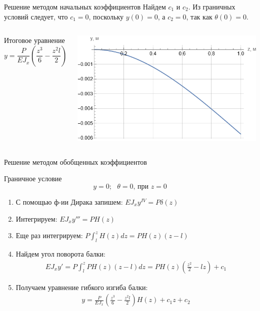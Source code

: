 \documentclass[ignoreonframetext,unicode]{beamer}
\begin{document}
	\begin{frame}{Решение методом начальных коэффициентов}
Найдем $c_1$ и $c_2$. Из граничных условий следует, что $c_1 = 0$, поскольку $y(0) = 0$, а $c_2 = 0$, так как $\theta(0) = 0$.
\begin{columns}
\begin{block}{Итоговое уравнение}	
	\[
	y = \frac{P}{E J_{x}} (\frac{z^3}{6} - \frac{z^2 l}{2})
	\]
\end{block}
\includegraphics[width=\textwidth]{g.1}
\end{columns}
\end{frame}

	\begin{frame}{Решение методом обобщенных коэффициентов}
	
	\begin{block}{Граничное условие}
		\[
		y = 0;\mbox{ } \theta = 0\mbox{, при } z = 0
		\]		
	\end{block}
	
	\begin{enumerate}
		\item С помощью ф-ии Дирака запишем: $E J_{x} y^{IV} = P \delta (z)$
		
		\item Интегрируем:
		$
			E J_{x} y''' = P H (z)
		$
		
		\item Еще раз интегрируем:
		$
			P \int_l^z  H (z) dz = P H (z) (z - l)
		$
		
		\item Найдем угол поворота балки:
		\begin{gather*}
			E J_{x} y' = P \int_l^z P H (z) (z - l) dz = P H(z)(\frac{z^2}{2} - l z) + c_1
		\end{gather*}
	
	\item Получаем уравнение гибкого изгиба балки:
	\begin{gather*}
		y = \frac{P}{E J_{x}} (\frac{z^3}{6} - \frac{z^2 l}{2}) H(z) + c_1 z + c_2
	\end{gather*}
		
	\end{enumerate}
\end{frame}
\end{document}

